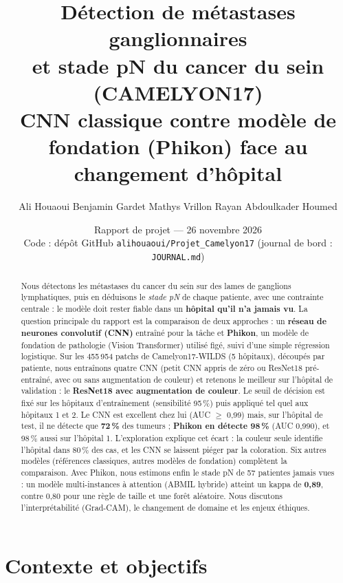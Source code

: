 \documentclass[11pt,a4paper]{article}
\title{\vspace{-1.4cm}\textbf{\color{bleu}Détection de métastases ganglionnaires\\et stade pN du cancer du sein (CAMELYON17)}\\[4pt]
\large CNN classique contre modèle de fondation (Phikon) face au changement d'hôpital}
\author{Ali Houaoui \quad Benjamin Gardet \quad Mathys Vrillon \quad Rayan Abdoulkader Houmed}
\date{Rapport de projet — 26 novembre 2026\\
\small Code : dépôt GitHub \texttt{alihouaoui/Projet\_Camelyon17} (journal de bord : \texttt{JOURNAL.md})}
\begin{document}
\maketitle
\thispagestyle{fancy}

\begin{abstract}
\noindent Nous détectons les métastases du cancer du sein sur des lames de ganglions lymphatiques, puis en déduisons le
\emph{stade pN} de chaque patiente, avec une contrainte centrale : le modèle doit rester fiable dans un \textbf{hôpital qu'il n'a
jamais vu}. La question principale du rapport est la comparaison de deux approches : un \textbf{réseau de neurones convolutif (CNN)}
entraîné pour la tâche et \textbf{Phikon}, un modèle de fondation de pathologie (Vision Transformer) utilisé figé, suivi d'une simple
régression logistique. Sur les 455\,954 patchs de Camelyon17-WILDS (5 hôpitaux), découpés par patiente, nous entraînons quatre CNN
(petit CNN appris de zéro ou ResNet18 pré-entraîné, avec ou sans augmentation de couleur) et retenons le meilleur sur l'hôpital de
validation : le \textbf{ResNet18 avec augmentation de couleur}. Le seuil de décision est fixé sur les hôpitaux d'entraînement
(sensibilité 95\,\%) puis appliqué tel quel aux hôpitaux 1 et 2. Le CNN est excellent chez lui (AUC $\geq$ 0,99) mais, sur l'hôpital de
test, il ne détecte que \textbf{72\,\%} des tumeurs ; \textbf{Phikon en détecte 98\,\%} (AUC 0,990), et 98\,\% aussi sur l'hôpital 1.
L'exploration explique cet écart : la couleur seule identifie l'hôpital dans 80\,\% des cas, et les CNN se laissent piéger par la
coloration. Six autres modèles (références classiques, autres modèles de fondation)
complètent la comparaison. Avec Phikon, nous estimons enfin le stade pN de 57 patientes jamais vues : un modèle multi-instances à
attention (ABMIL hybride) atteint un kappa de \textbf{0,89}, contre 0,80 pour une règle de taille et une forêt aléatoire. Nous
discutons l'interprétabilité (Grad-CAM), le changement de domaine et les enjeux éthiques.
\end{abstract}

\tableofcontents

\section{Contexte et objectifs}
\end{document}
